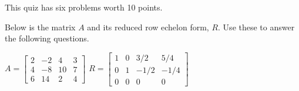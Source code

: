 \documentclass[11pt,fleqn]{article}
\def\vecthree#1#2#3{\begin{bmatrix}#1\\#2\\#3\end{bmatrix}}
\def\bbm{\begin{bmatrix}}
\def\ebm{\end{bmatrix}}
\begin{document}
\renewcommand{\headrulewidth}{0pt}
\newcommand{\blank}[1]{\rule{#1}{0.75pt}}
\renewcommand{\d}{\displaystyle}

This quiz has six problems worth 10 points.

Below is the matrix $A$ and its reduced row echelon form, $R$. Use these to answer the following questions.

\begin{center}
$A=\bbm 2& -2& 4&3 \\
4 & -8& 10& 7\\
6& 14&2&4 \ebm$
\hspace{.3in}
$R= \bbm 1&0&3/2&5/4\\
0&1&-1/2&-1/4\\
0&0&0&0 \ebm$
\end{center}
\end{document}
